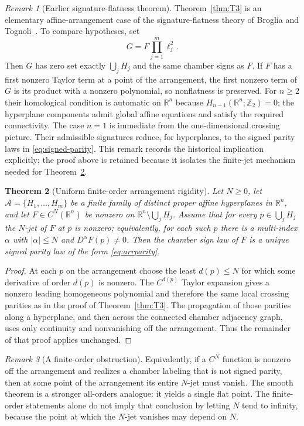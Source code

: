 \documentclass[11pt]{article}
\newtheorem{theorem}{Theorem}[section]
\theoremstyle{definition}
\theoremstyle{remark}
\newtheorem{remark}[theorem]{Remark}
\newcommand{\R}{\mathbb{R}}
\newcommand{\cA}{\mathcal{A}}
\begin{document}
\begin{remark}[Earlier signature-flatness theorem]\label{rem:BT}
Theorem~\ref{thm:T3} is an elementary affine-arrangement case of the signature-flatness theory of Broglia and Tognoli~\cite[Theorem~4.2]{BrogliaTognoli1989}. To compare hypotheses, set
\[
 G=F\prod_{j=1}^m\ell_j^2.
\]
Then $G$ has zero set exactly $\bigcup_jH_j$ and the same chamber signs as $F$. If $F$ has a first nonzero Taylor term at a point of the arrangement, the first nonzero term of $G$ is its product with a nonzero polynomial, so nonflatness is preserved. For $n\ge2$ their homological condition is automatic on $\R^n$ because $H_{n-1}(\R^n;\mathbb Z_2)=0$; the hyperplane components admit global affine equations and satisfy the required connectivity. The case $n=1$ is immediate from the one-dimensional crossing picture. Their admissible signatures reduce, for hyperplanes, to the signed parity laws in \eqref{eq:signed-parity}. This remark records the historical implication explicitly; the proof above is retained because it isolates the finite-jet mechanism needed for Theorem~\ref{thm:finitearr}.
\end{remark}

\begin{theorem}[Uniform finite-order arrangement rigidity]\label{thm:finitearr}
Let $N\ge0$, let $\cA=\{H_1,\dots,H_m\}$ be a finite family of distinct proper affine hyperplanes in $\R^n$, and let $F\in C^N(\R^n)$ be nonzero on $\R^n\setminus\bigcup_jH_j$. Assume that for every $p\in\bigcup_jH_j$ the $N$-jet of $F$ at $p$ is nonzero; equivalently, for each such $p$ there is a multi-index $\alpha$ with $|\alpha|\le N$ and $D^\alpha F(p)\ne0$. Then the chamber sign law of $F$ is a unique signed parity law of the form \eqref{eq:arrparity}.
\end{theorem}

\begin{proof}
At each $p$ on the arrangement choose the least $d(p)\le N$ for which some derivative of order $d(p)$ is nonzero. The $C^{d(p)}$ Taylor expansion gives a nonzero leading homogeneous polynomial and therefore the same local crossing parities as in the proof of Theorem~\ref{thm:T3}. The propagation of those parities along a hyperplane, and then across the connected chamber adjacency graph, uses only continuity and nonvanishing off the arrangement. Thus the remainder of that proof applies unchanged.
\end{proof}

\begin{remark}[A finite-order obstruction]
Equivalently, if a $C^N$ function is nonzero off the arrangement and realizes a chamber labeling that is not signed parity, then at some point of the arrangement its entire $N$-jet must vanish. The smooth theorem is a stronger all-orders analogue: it yields a single flat point. The finite-order statements alone do not imply that conclusion by letting $N$ tend to infinity, because the point at which the $N$-jet vanishes may depend on $N$.
\end{remark}
\end{document}
